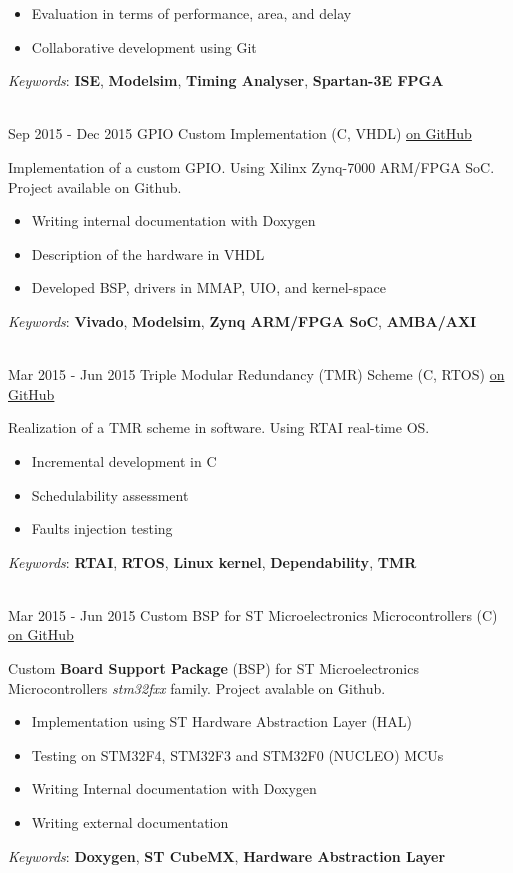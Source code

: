 \documentclass[letterpaper]{twentysecondcv} %
\begin{document}
\begin{twenty}
{\begin{itemize}
                \item Evaluation in terms of performance, area, and delay
                \item Collaborative development using Git
		    \end{itemize}
            \textit{Keywords}: \textbf{ISE}, \textbf{Modelsim}, \textbf{Timing Analyser}, \textbf{Spartan-3E FPGA}
        }\\
    \twentyitem
    	{Sep 2015 -}
		{Dec 2015}
        {GPIO Custom Implementation (C, VHDL)}
        {\href{https://github.com/artic92/gpio-zynq-7000}{on GitHub}}
        {}
        {
        Implementation of a custom GPIO. Using Xilinx Zynq-7000 ARM/FPGA SoC. 
        Project available on Github.
            \begin{itemize}
                \item Writing internal documentation with Doxygen
                \item Description of the hardware in VHDL
                \item Developed BSP, drivers in MMAP, UIO, and kernel-space
		    \end{itemize}
		    \textit{Keywords}: \textbf{Vivado}, \textbf{Modelsim}, \textbf{Zynq ARM/FPGA SoC}, \textbf{AMBA/AXI}
        }\\
    \twentyitem
    	{Mar 2015 -}
		{Jun 2015}
        {Triple Modular Redundancy (TMR) Scheme (C, RTOS)}
        {\href{https://github.com/artic92/tmr_rtai}{on GitHub}}
        {}
        {
        {
            Realization of a TMR scheme in software. Using RTAI real-time OS.
            \begin{itemize}
                \item Incremental development in C
                \item Schedulability assessment
                \item Faults injection testing
		    \end{itemize}
		    \textit{Keywords}: \textbf{RTAI}, \textbf{RTOS}, \textbf{Linux kernel}, \textbf{Dependability}, \textbf{TMR}
		}
        }\\
    \twentyitem
    	{Mar 2015 -}
		{Jun 2015}
        {Custom BSP for ST Microelectronics Microcontrollers (C)}
        {\href{https://github.com/artic92/stm32-bsp}{on GitHub}}
        {}
        {
        {
            Custom \textbf{Board Support Package} (BSP) for ST Microelectronics Microcontrollers \textit{stm32fxx} family.
            Project avalable on Github.
            \begin{itemize}
                \item Implementation using ST Hardware Abstraction Layer (HAL)
                \item Testing on STM32F4, STM32F3 and STM32F0 (NUCLEO) MCUs
                \item Writing Internal documentation with Doxygen
                \item Writing external documentation
		    \end{itemize}
            \textit{Keywords}: \textbf{Doxygen}, \textbf{ST CubeMX}, \textbf{Hardware Abstraction Layer}
		}
        }
\end{twenty}
\end{document}
